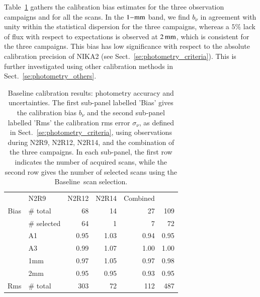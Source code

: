 \documentclass[traditionalabstract]{aa}
\newcommand{\baseline}{Baseline}%
\newcommand{\lp}[1]{#1}
\begin{document}
{\begin{figure}[!thbp]
\begin{center}
  \end{center}
\end{figure}
%
Table~\ref{tab:baseline-photometry} gathers the calibration bias
estimates for the three observation campaigns and for all the scans.
In the $1\rm{-mm}$ band, we find
$b_\nu$ in agreement with unity within the statistical dispersion for
the three campaigns,
whereas a $5\%$ lack of flux with respect to expectations is observed
at $2\,\rm{mm}$, which is consistent for the three campaigns. This bias has low significance with respect to the absolute calibration precision of
NIKA2 (see Sect.~\ref{se:photometry_criteria}).
This is further investigated using other calibration methods
in Sect.~\ref{se:photometry_others}.

\begin{table}[!thbp]
  \begin{center}
    \caption[Baseline calibration results]{Baseline calibration results:
  photometry accuracy and uncertainties. The first sub-panel labelled 'Bias' gives the
  calibration bias $b_{\nu}$ and the second sub-panel labelled 'Rms' the calibration
  rms error $\sigma_{\nu}$, as defined in
  Sect.~\ref{se:photometry_criteria},
  using observations during N2R9, N2R12, N2R14, and the combination of
  the three campaigns. {\lp In each sub-panel, the first row indicates the
    number of acquired scans, while the second row gives the
    number of selected scans using the \baseline\ scan selection.}}
\label{tab:baseline-photometry}
\begin{tabular}{clrrrr}
  \hline\hline
  \noalign{\smallskip}
   \multicolumn{2}{c}{Characteristics} &  N2R9  & N2R12   &  N2R14 & Combined \\
  \noalign{\smallskip}
  \hline
  \noalign{\smallskip}
  Bias &  $\#$ total    &  68    &  14     &   27     &    109    \\
       &  $\#$ selected &  64    &   1     &   7      &     72    \\
       &  A1            &  0.95  &  1.03   &   0.94   &   0.95    \\
       &  A3            &  0.99  &  1.07   &   1.00   &   1.00    \\
       &  1mm           &  0.97  &  1.05   &   0.97   &   0.98    \\
       &  2mm           &  0.95  &  0.95   &   0.93   &   0.95    \\
  \hline
  \noalign{\smallskip}
  Rms  &  $\#$ total    &  303   &  72     &   112    &    487   \\

\end{tabular}
\end{center}
\end{table}}
\end{document}
